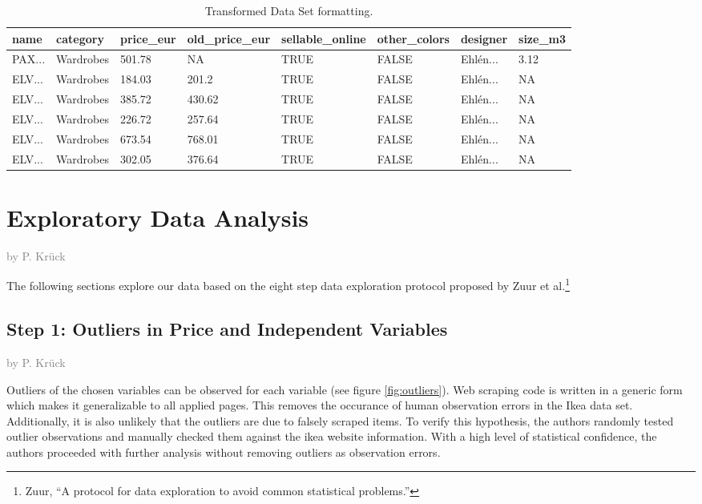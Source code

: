 \documentclass[a4paper, nobind]{templates/ociamthesis}
\begin{document}
\begin{table}

\caption{\label{tab:tidy-ikea}Transformed Data Set formatting.}
\centering
\fontsize{8}{10}\selectfont
\begin{tabular}[t]{l|l|l|l|l|l|l|l}
\hline
name & category & price\_eur & old\_price\_eur & sellable\_online & other\_colors & designer & size\_m3\\
\hline
PAX... & Wardrobes & 501.78 & NA & TRUE & FALSE & Ehlén... & 3.12\\
\hline
ELV... & Wardrobes & 184.03 & 201.2 & TRUE & FALSE & Ehlén... & NA\\
\hline
ELV... & Wardrobes & 385.72 & 430.62 & TRUE & FALSE & Ehlén... & NA\\
\hline
ELV... & Wardrobes & 226.72 & 257.64 & TRUE & FALSE & Ehlén... & NA\\
\hline
ELV... & Wardrobes & 673.54 & 768.01 & TRUE & FALSE & Ehlén... & NA\\
\hline
ELV... & Wardrobes & 302.05 & 376.64 & TRUE & FALSE & Ehlén... & NA\\
\hline
\end{tabular}
\end{table}

\hypertarget{tbd}{%
\section{Exploratory Data Analysis}\label{tbd}}

\textcolor{gray}{by P. Krück}

The following sections explore our data based on the eight step data exploration protocol proposed by Zuur et al.\footnote{Zuur, ``A protocol for data exploration to avoid common statistical problems.''}

\hypertarget{outliers}{%
\subsection{Step 1: Outliers in Price and Independent Variables}\label{outliers}}

\textcolor{gray}{by P. Krück}

Outliers of the chosen variables can be observed for each variable (see figure \ref{fig:outliers}).
Web scraping code is written in a generic form which makes it generalizable to all applied pages. This removes the occurance of human observation errors in the Ikea data set. Additionally, it is also unlikely that the outliers are due to falsely scraped items.
To verify this hypothesis, the authors randomly tested outlier observations and manually checked them against the ikea website information. With a high level of statistical confidence, the authors proceeded with further analysis without removing outliers as observation errors.
\end{document}
